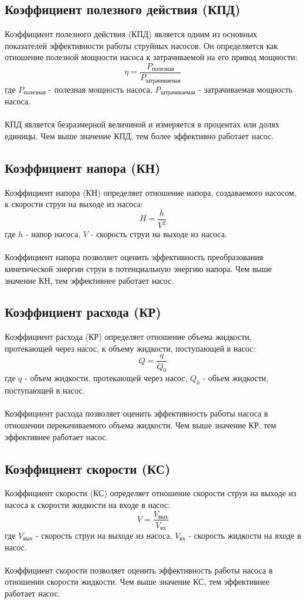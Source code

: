 \documentclass{article}
\begin{document}
\subsection{Коэффициент полезного действия (КПД)}
Коэффициент полезного действия (КПД) является одним из основных показателей эффективности работы струйных насосов. Он определяется как отношение полезной мощности насоса к затрачиваемой на его привод мощности:
\begin{equation}
\eta = \frac{P_{\text{полезная}}}{P_{\text{затрачиваемая}}}
\end{equation}
где $P_{\text{полезная}}$ - полезная мощность насоса, $P_{\text{затрачиваемая}}$ - затрачиваемая мощность насоса.\\
~\\
КПД является безразмерной величиной и измеряется в процентах или долях единицы. Чем выше значение КПД, тем более эффективно работает насос.
\subsection{Коэффициент напора (КН)}
Коэффициент напора (КН) определяет отношение напора, создаваемого насосом, к скорости струи на выходе из насоса:
\begin{equation}
H = \frac{h}{V^2}
\end{equation}
где $h$ - напор насоса, $V$ - скорость струи на выходе из насоса.\\
~\\
Коэффициент напора позволяет оценить эффективность преобразования кинетической энергии струи в потенциальную энергию напора. Чем выше значение КН, тем эффективнее работает насос.
\subsection{Коэффициент расхода (КР)}
Коэффициент расхода (КР) определяет отношение объема жидкости, протекающей через насос, к объему жидкости, поступающей в насос:
\begin{equation}
Q = \frac{q}{Q_0}
\end{equation}
где $q$ - объем жидкости, протекающей через насос, $Q_0$ - объем жидкости, поступающей в насос.\\
~\\
Коэффициент расхода позволяет оценить эффективность работы насоса в отношении перекачиваемого объема жидкости. Чем выше значение КР, тем эффективнее работает насос.
\subsection{Коэффициент скорости (КС)}
Коэффициент скорости (КС) определяет отношение скорости струи на выходе из насоса к скорости жидкости на входе в насос:
\begin{equation}
V = \frac{V_{\text{вых}}}{V_{\text{вх}}}
\end{equation}
где $V_{\text{вых}}$ - скорость струи на выходе из насоса, $V_{\text{вх}}$ - скорость жидкости на входе в насос.\\
~\\
Коэффициент скорости позволяет оценить эффективность работы насоса в отношении скорости жидкости. Чем выше значение КС, тем эффективнее работает насос.
\end{document}
